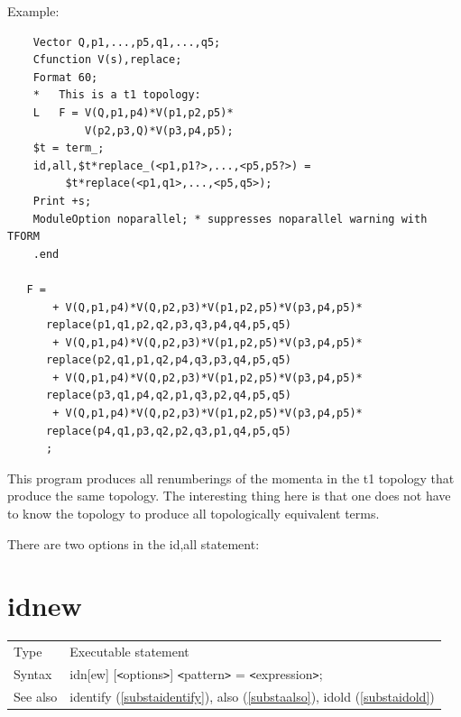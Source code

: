 \noindent Example:
\begin{verbatim}
    Vector Q,p1,...,p5,q1,...,q5;
    Cfunction V(s),replace;
    Format 60;
    *   This is a t1 topology:
    L   F = V(Q,p1,p4)*V(p1,p2,p5)*
            V(p2,p3,Q)*V(p3,p4,p5);
    $t = term_;
    id,all,$t*replace_(<p1,p1?>,...,<p5,p5?>) =
         $t*replace(<p1,q1>,...,<p5,q5>);
    Print +s;
    ModuleOption noparallel; * suppresses noparallel warning with TFORM
    .end

   F =
       + V(Q,p1,p4)*V(Q,p2,p3)*V(p1,p2,p5)*V(p3,p4,p5)*
      replace(p1,q1,p2,q2,p3,q3,p4,q4,p5,q5)
       + V(Q,p1,p4)*V(Q,p2,p3)*V(p1,p2,p5)*V(p3,p4,p5)*
      replace(p2,q1,p1,q2,p4,q3,p3,q4,p5,q5)
       + V(Q,p1,p4)*V(Q,p2,p3)*V(p1,p2,p5)*V(p3,p4,p5)*
      replace(p3,q1,p4,q2,p1,q3,p2,q4,p5,q5)
       + V(Q,p1,p4)*V(Q,p2,p3)*V(p1,p2,p5)*V(p3,p4,p5)*
      replace(p4,q1,p3,q2,p2,q3,p1,q4,p5,q5)
      ;
\end{verbatim}
This program produces all renumberings of the momenta in the t1 topology 
that produce the same topology. The interesting thing here is that one does 
not have to know the topology to produce all topologically equivalent 
terms.

There are two options in the id,all statement: \hfill \\
\vspace{10mm}


\section{idnew}
\label{substaidnew}

\noindent \begin{tabular}{ll}
Type & Executable statement\\
Syntax & idn[ew] [{\tt<}options{\tt>}] {\tt<}pattern{\tt>} = {\tt<}expression{\tt>};
\\ See also & identify (\ref{substaidentify}),
              also (\ref{substaalso}),
              idold (\ref{substaidold})
\end{tabular} \vspace{4mm}

